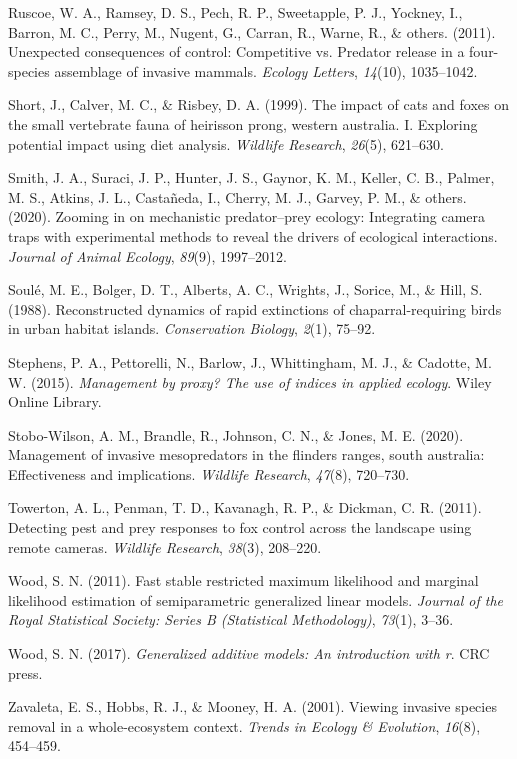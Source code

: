 \documentclass[]{elsarticle} %
\begin{document}
\leavevmode\hypertarget{ref-ruscoe2011}{}%
Ruscoe, W. A., Ramsey, D. S., Pech, R. P., Sweetapple, P. J., Yockney, I., Barron, M. C., Perry, M., Nugent, G., Carran, R., Warne, R., \& others. (2011). Unexpected consequences of control: Competitive vs. Predator release in a four-species assemblage of invasive mammals. \emph{Ecology Letters}, \emph{14}(10), 1035--1042.

\leavevmode\hypertarget{ref-short1999}{}%
Short, J., Calver, M. C., \& Risbey, D. A. (1999). The impact of cats and foxes on the small vertebrate fauna of heirisson prong, western australia. I. Exploring potential impact using diet analysis. \emph{Wildlife Research}, \emph{26}(5), 621--630.

\leavevmode\hypertarget{ref-smith2020}{}%
Smith, J. A., Suraci, J. P., Hunter, J. S., Gaynor, K. M., Keller, C. B., Palmer, M. S., Atkins, J. L., Castañeda, I., Cherry, M. J., Garvey, P. M., \& others. (2020). Zooming in on mechanistic predator--prey ecology: Integrating camera traps with experimental methods to reveal the drivers of ecological interactions. \emph{Journal of Animal Ecology}, \emph{89}(9), 1997--2012.

\leavevmode\hypertarget{ref-soule1988}{}%
Soulé, M. E., Bolger, D. T., Alberts, A. C., Wrights, J., Sorice, M., \& Hill, S. (1988). Reconstructed dynamics of rapid extinctions of chaparral-requiring birds in urban habitat islands. \emph{Conservation Biology}, \emph{2}(1), 75--92.

\leavevmode\hypertarget{ref-stephens2015}{}%
Stephens, P. A., Pettorelli, N., Barlow, J., Whittingham, M. J., \& Cadotte, M. W. (2015). \emph{Management by proxy? The use of indices in applied ecology}. Wiley Online Library.

\leavevmode\hypertarget{ref-stobo2020management}{}%
Stobo-Wilson, A. M., Brandle, R., Johnson, C. N., \& Jones, M. E. (2020). Management of invasive mesopredators in the flinders ranges, south australia: Effectiveness and implications. \emph{Wildlife Research}, \emph{47}(8), 720--730.

\leavevmode\hypertarget{ref-towerton2011}{}%
Towerton, A. L., Penman, T. D., Kavanagh, R. P., \& Dickman, C. R. (2011). Detecting pest and prey responses to fox control across the landscape using remote cameras. \emph{Wildlife Research}, \emph{38}(3), 208--220.

\leavevmode\hypertarget{ref-wood2011}{}%
Wood, S. N. (2011). Fast stable restricted maximum likelihood and marginal likelihood estimation of semiparametric generalized linear models. \emph{Journal of the Royal Statistical Society: Series B (Statistical Methodology)}, \emph{73}(1), 3--36.

\leavevmode\hypertarget{ref-wood2017}{}%
Wood, S. N. (2017). \emph{Generalized additive models: An introduction with r}. CRC press.

\leavevmode\hypertarget{ref-zavaleta2001}{}%
Zavaleta, E. S., Hobbs, R. J., \& Mooney, H. A. (2001). Viewing invasive species removal in a whole-ecosystem context. \emph{Trends in Ecology \& Evolution}, \emph{16}(8), 454--459.
\end{document}
